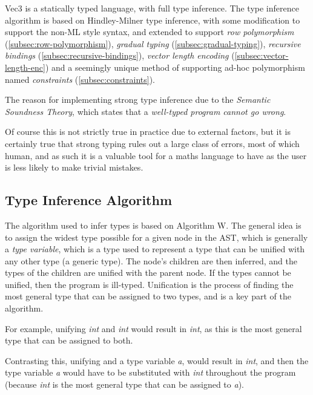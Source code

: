 Vec3 is a statically typed language, with full type inference.
The type inference algorithm is based on Hindley-Milner type inference\citep{sulzmann2000general}, with some
modification to support the non-ML style syntax, and extended to support \textit{row polymorphism}\citep{morris2019abstracting} (\ref{subsec:row-polymorphism}), \textit{gradual typing}\citep{garcia2016abstracting}
(\ref{subsec:gradual-typing}), \textit{recursive bindings} (\ref{subsec:recursive-bindings}), 
\textit{vector length encoding} (\ref{subsec:vector-length-enc}) and a seemingly unique method of supporting ad-hoc 
polymorphism named \textit{constraints} (\ref{subsec:constraints}).

The reason for implementing strong type inference due to the \textit{Semantic Soundness Theory}\citep{timany2024logical}, which states that a \textit{well-typed program cannot go wrong}.

Of course this is not strictly true in practice due to external factors, but it is certainly true that strong typing
rules out a large class of errors, most of which human, and as such it is a valuable tool for a maths language to
have as the user is less likely to make trivial mistakes.

\subsection{Type Inference Algorithm}\label{subsec:type-inference-algorithm}

The algorithm used to infer types is based on Algorithm W\citep{milner1978theory}.
The general idea is to assign the widest type possible for a given node in the AST, which is generally a
\textit{type variable}, which is a type used to represent a type that can be unified with any other type (a generic
type).
The node's children are then inferred, and the types of the children are unified with the parent node.
If the types cannot be unified, then the program is ill-typed.
Unification is the process of finding the most general type that can be assigned to two types, and is a key part of
the algorithm.

For example, unifying \textit{int} and \textit{int} would result in \textit{int}, as this is the most general type that
can be assigned to both.

Contrasting this, unifying  and a type variable \textit{a}, would result in \textit{int}, and then the type
variable \textit{a} would have to be substituted with \textit{int} throughout the program (because \textit{int} is the
most general type that can be assigned to \textit{a}).

